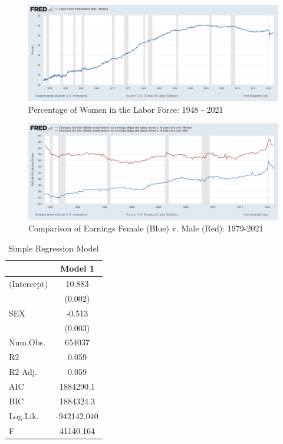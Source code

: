 \documentclass[12pt, English]{article}
\begin{document}
\begin{figure}[!htb]
\centering
\includegraphics[scale=0.4]{fredgraph (3).png}
\caption{Percentage of Women in the Labor Force: 1948 - 2021}
\label{fig:Figure 1}
\end{figure}

\begin{figure}[h!]
\centering
\includegraphics[scale=0.4]{fredgraph (2).png}
\caption{Comparison of Earnings Female (Blue) v. Male (Red): 1979-2021}
\label{fig:Figure 1}
\end{figure}

\newpage
\begin{table}[htp]
\centering %
    \caption{Simple Regression Model}
    \vspace{7.5mm} %
\begin{tabular}[t]{lc}
\toprule
  & Model 1\\
\midrule
(Intercept) & 10.883\\
 & (0.002)\\
SEX & -0.513\\
 & (0.003)\\
\midrule
Num.Obs. & 654037\\
R2 & 0.059\\
R2 Adj. & 0.059\\
AIC & 1884290.1\\
BIC & 1884324.3\\
Log.Lik. & -942142.040\\
F & 41140.164\\
\bottomrule
\end{tabular}
\end{table}
\end{document}

